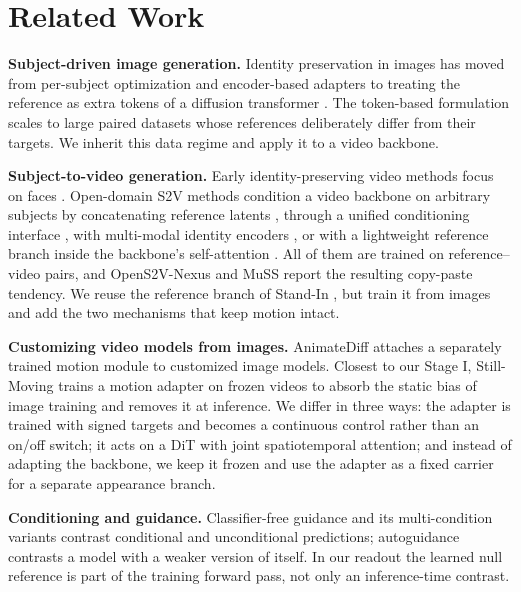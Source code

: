 \section{Related Work}
\label{sec:related}

\textbf{Subject-driven image generation.} Identity preservation in images has moved from per-subject optimization \cite{ruiz2023dreambooth, gal2022textual} and encoder-based adapters \cite{ye2023ipadapter, li2023blipdiffusion} to treating the reference as extra tokens of a diffusion transformer \cite{tan2024ominicontrol, xiao2024omnigen, wu2025uno}. The token-based formulation scales to large paired datasets whose references deliberately differ from their targets. We inherit this data regime and apply it to a video backbone.

\textbf{Subject-to-video generation.} Early identity-preserving video methods focus on faces \cite{he2024idanimator, yuan2024consisid}. Open-domain S2V methods condition a video backbone on arbitrary subjects by concatenating reference latents \cite{liu2025phantom, fei2025skyreelsa2}, through a unified conditioning interface \cite{jiang2025vace}, with multi-modal identity encoders \cite{hu2025hunyuancustom, deng2025magref}, or with a lightweight reference branch inside the backbone's self-attention \cite{xue2025standin}. All of them are trained on reference--video pairs, and OpenS2V-Nexus \cite{yuan2025opens2v} and MuSS \cite{muss2025} report the resulting copy-paste tendency. We reuse the reference branch of Stand-In \cite{xue2025standin}, but train it from images and add the two mechanisms that keep motion intact.

\textbf{Customizing video models from images.} AnimateDiff \cite{guo2023animatediff} attaches a separately trained motion module to customized image models. Closest to our Stage I, Still-Moving \cite{chefer2024stillmoving} trains a motion adapter on frozen videos to absorb the static bias of image training and removes it at inference. We differ in three ways: the adapter is trained with signed targets and becomes a continuous control rather than an on/off switch; it acts on a DiT with joint spatiotemporal attention; and instead of adapting the backbone, we keep it frozen and use the adapter as a fixed carrier for a separate appearance branch.

\textbf{Conditioning and guidance.} Classifier-free guidance \cite{ho2022cfg} and its multi-condition variants \cite{brooks2023instructpix2pix} contrast conditional and unconditional predictions; autoguidance \cite{karras2024autoguidance} contrasts a model with a weaker version of itself. In our readout the learned null reference is part of the training forward pass, not only an inference-time contrast.
